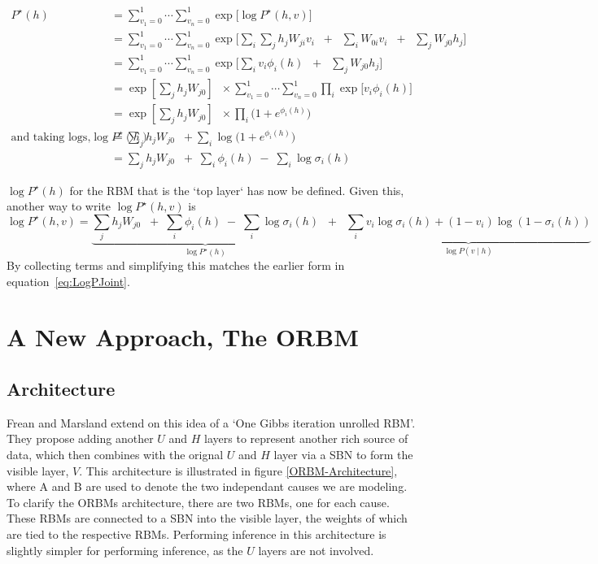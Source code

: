 $$
 \begin{aligned}
P^\star(h) &= \sum_{v_1=0}^1 \cdots \sum_{v_n=0}^1 \exp \bigg[  \log P^{\star}(h,v) \bigg] \\
&= \sum_{v_1=0}^1 \cdots \sum_{v_n=0}^1 \exp \bigg[  \sum_i  \sum_j h_j W_{ji} v_i \;\; + \;\; \sum_i W_{0i} v_i \;\; + \;\; \sum_j W_{j0} h_j \bigg] \\
&= \sum_{v_1=0}^1 \cdots \sum_{v_n=0}^1 \exp \bigg[  \sum_i v_i \phi_i(h)  \;\; + \;\; \sum_j W_{j0} h_j \bigg] \\
&= \exp\left[ \sum_j h_j  W_{j0} \right] \;\; \times \sum_{v_1=0}^1 \cdots \sum_{v_n=0}^1 \prod_i \exp\bigg[ v_i \phi_i(h) \bigg] \\
&= \exp\left[\sum_j h_j  W_{j0}\right] \;\; \times \prod_i \bigg( 1 + e^{\phi_i(h) } \bigg) \\
\text{and taking logs,}
\log P^\star(h) &= \sum_j h_j  W_{j0} \;\; +  \sum_i \log \bigg( 1 + e^{\phi_i(h) } \bigg)
\\
&= \sum_j h_j  W_{j0} \;\; + \; \sum_i \phi_i(h) \;  - \; \sum_i \log \sigma_i(h)
\end{aligned}
$$

$\log P^\star(h)$ for the RBM that is the `top layer` has now be defined. Given this, another way to write $\log P^\star(h,v)$ is
\begin{equation}\label{eq:equivalent-rbm-log-joint}
\log P^\star(h,v) = \underbrace{\sum_j h_j  W_{j0} \;\; + \; \sum_i \phi_i(h) \;  - \; \sum_i \log \sigma_i(h)}_{\log P^\star(h)} \;\;+\;\; \underbrace{\sum_i v_i \log \sigma_i(h) + (1-v_i) \log (1 - \sigma_i(h))}_{\log P(v \mid h)}
\end{equation}
By collecting terms and simplifying this matches the earlier form in equation~\ref{eq:LogPJoint}.


\section{A New Approach, The ORBM}

\subsection{Architecture}

Frean and Marsland extend on this idea of a `One Gibbs iteration unrolled RBM'. They propose adding another $U$ and $H$ layers to represent another rich source of data, which then combines with the orignal $U$ and $H$ layer via a SBN to form the visible layer, $V$. This architecture is illustrated in figure \ref{ORBM-Architecture}, where A and B are used to denote the two independant causes we are modeling. To clarify the ORBMs architecture, there are two RBMs, one for each cause. These RBMs are connected to a SBN into the visible layer, the weights of which are tied to the respective RBMs. Performing inference in this architecture is slightly simpler for performing inference, as the $U$ layers are not involved.

